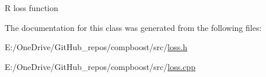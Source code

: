 {\ttfamily R} loss function 



The documentation for this class was generated from the following files\+:\begin{DoxyCompactItemize}
\item 
E\+:/\+One\+Drive/\+Git\+Hub\+\_\+repos/compboost/src/\mbox{\hyperlink{loss_8h}{loss.\+h}}\item 
E\+:/\+One\+Drive/\+Git\+Hub\+\_\+repos/compboost/src/\mbox{\hyperlink{loss_8cpp}{loss.\+cpp}}\end{DoxyCompactItemize}
